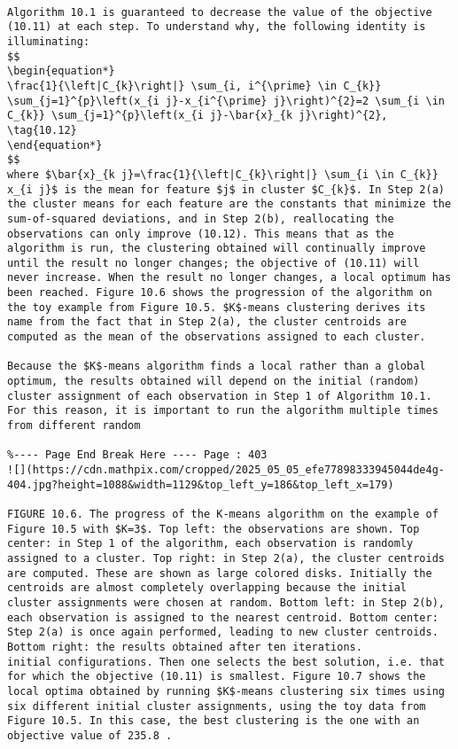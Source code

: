 \documentclass[10pt]{article}
\begin{document}
\begin{verbatim}

Algorithm 10.1 is guaranteed to decrease the value of the objective (10.11) at each step. To understand why, the following identity is illuminating:
$$
\begin{equation*}
\frac{1}{\left|C_{k}\right|} \sum_{i, i^{\prime} \in C_{k}} \sum_{j=1}^{p}\left(x_{i j}-x_{i^{\prime} j}\right)^{2}=2 \sum_{i \in C_{k}} \sum_{j=1}^{p}\left(x_{i j}-\bar{x}_{k j}\right)^{2}, \tag{10.12}
\end{equation*}
$$
where $\bar{x}_{k j}=\frac{1}{\left|C_{k}\right|} \sum_{i \in C_{k}} x_{i j}$ is the mean for feature $j$ in cluster $C_{k}$. In Step 2(a) the cluster means for each feature are the constants that minimize the sum-of-squared deviations, and in Step 2(b), reallocating the observations can only improve (10.12). This means that as the algorithm is run, the clustering obtained will continually improve until the result no longer changes; the objective of (10.11) will never increase. When the result no longer changes, a local optimum has been reached. Figure 10.6 shows the progression of the algorithm on the toy example from Figure 10.5. $K$-means clustering derives its name from the fact that in Step 2(a), the cluster centroids are computed as the mean of the observations assigned to each cluster.

Because the $K$-means algorithm finds a local rather than a global optimum, the results obtained will depend on the initial (random) cluster assignment of each observation in Step 1 of Algorithm 10.1. For this reason, it is important to run the algorithm multiple times from different random

%---- Page End Break Here ---- Page : 403
![](https://cdn.mathpix.com/cropped/2025_05_05_efe77898333945044de4g-404.jpg?height=1088&width=1129&top_left_y=186&top_left_x=179)

FIGURE 10.6. The progress of the K-means algorithm on the example of Figure 10.5 with $K=3$. Top left: the observations are shown. Top center: in Step 1 of the algorithm, each observation is randomly assigned to a cluster. Top right: in Step 2(a), the cluster centroids are computed. These are shown as large colored disks. Initially the centroids are almost completely overlapping because the initial cluster assignments were chosen at random. Bottom left: in Step 2(b), each observation is assigned to the nearest centroid. Bottom center: Step 2(a) is once again performed, leading to new cluster centroids. Bottom right: the results obtained after ten iterations.
initial configurations. Then one selects the best solution, i.e. that for which the objective (10.11) is smallest. Figure 10.7 shows the local optima obtained by running $K$-means clustering six times using six different initial cluster assignments, using the toy data from Figure 10.5. In this case, the best clustering is the one with an objective value of 235.8 .


\end{verbatim}
\end{document}
